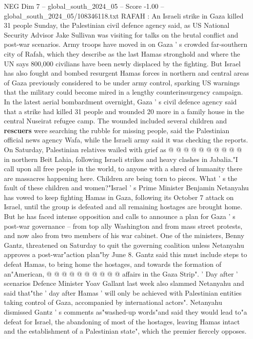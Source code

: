 \begin{textsample}{NEG Dim 7 – global\_south\_2024\_05 – Score -1.00 – global\_south\_2024\_05/108346118.txt}  \label{ex:f7_neg_245}
RAFAH : An Israeli strike in Gaza killed 31 people Sunday, the Palestinian civil defence agency said, as US National Security Advisor Jake Sullivan was visiting for talks on the brutal conflict and post-war scenarios.
Army troops have moved in on Gaza ' s crowded far-southern city of Rafah, which they describe as the last Hamas stronghold and where the UN says 800,000 civilians have been newly displaced by the fighting.
But Israel has also fought and bombed resurgent Hamas forces in northern and central areas of Gaza previously considered to be under army control, sparking US warnings that the military could become mired in a lengthy counterinsurgency campaign.
In the latest aerial bombardment overnight, Gaza ' s civil defence agency said that a strike had killed 31 people and wounded 20 more in a family house in the central Nuseirat refugee camp.
The wounded included several children and \textbf{rescuers} were searching the rubble for missing people, said the Palestinian official news agency Wafa, while the Israeli army said it was checking the reports.
On Saturday, Palestinian relatives wailed with grief as @ @ @ @ @ @ @ @ @ @ in northern Beit Lahia, following Israeli strikes and heavy clashes in Jabalia."I call upon all free people in the world, to anyone with a shred of humanity there are massacres happening here.
Children are being torn to pieces.
What ' s the fault of these children and women?"Israel ' s Prime Minister Benjamin Netanyahu has vowed to keep fighting Hamas in Gaza, following its October 7 attack on Israel, until the group is defeated and all remaining hostages are brought home.
But he has faced intense opposition and calls to announce a plan for Gaza ' s post-war governance -- from top ally Washington and from mass street protests, and now also from two members of his war cabinet.
One of the ministers, Benny Gantz, threatened on Saturday to quit the governing coalition unless Netanyahu approves a post-war"action plan"by June 8.
Gantz said this must include steps to defeat Hamas, to bring home the hostages, and towards the formation of an"American, @ @ @ @ @ @ @ @ @ @ affairs in the Gaza Strip". ' Day after ' scenarios Defence Minister Yoav Gallant last week also slammed Netanyahu and said that"the ' day after Hamas ' will only be achieved with Palestinian entities taking control of Gaza, accompanied by international actors".
Netanyahu dismissed Gantz ' s comments as"washed-up words"and said they would lead to"a defeat for Israel, the abandoning of most of the hostages, leaving Hamas intact and the establishment of a Palestinian state", which the premier fiercely opposes.

\end{textsample}
